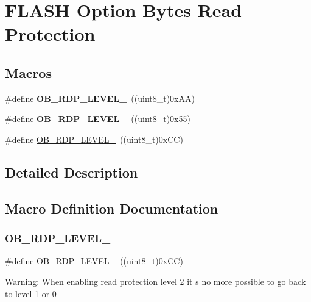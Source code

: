 \hypertarget{group___f_l_a_s_h_ex___option___bytes___read___protection}{}\section{F\+L\+A\+SH Option Bytes Read Protection}
\label{group___f_l_a_s_h_ex___option___bytes___read___protection}
\subsection*{Macros}
\begin{DoxyCompactItemize}
\item 
\mbox{\label{group___f_l_a_s_h_ex___option___bytes___read___protection_ga22c7871bda267a2844ab9ca9f7bd38e4}} 
\#define {\bfseries O\+B\+\_\+\+R\+D\+P\+\_\+\+L\+E\+V\+E\+L\+\_}~((uint8\+\_\+t)0x\+A\+A)
\item 
\mbox{\label{group___f_l_a_s_h_ex___option___bytes___read___protection_ga778207f0d12d87bbff9d55e985aba5bc}} 
\#define {\bfseries O\+B\+\_\+\+R\+D\+P\+\_\+\+L\+E\+V\+E\+L\+\_}~((uint8\+\_\+t)0x55)
\item 
\#define \mbox{\hyperlink{group___f_l_a_s_h_ex___option___bytes___read___protection_ga2262afca565429ce2808d835c49e5ee6}{O\+B\+\_\+\+R\+D\+P\+\_\+\+L\+E\+V\+E\+L\+\_}}~((uint8\+\_\+t)0x\+C\+C)
\end{DoxyCompactItemize}


\subsection{Detailed Description}


\subsection{Macro Definition Documentation}
\mbox{\label{group___f_l_a_s_h_ex___option___bytes___read___protection_ga2262afca565429ce2808d835c49e5ee6}} 
\subsubsection{\texorpdfstring{O\+B\+\_\+\+R\+D\+P\+\_\+\+L\+E\+V\+E\+L\+\_}{OB\_RDP\_LEVEL\_2}}
{\footnotesize\ttfamily \#define O\+B\+\_\+\+R\+D\+P\+\_\+\+L\+E\+V\+E\+L\+\_~((uint8\+\_\+t)0x\+C\+C)}

Warning\+: When enabling read protection level 2 it s no more possible to go back to level 1 or 0 